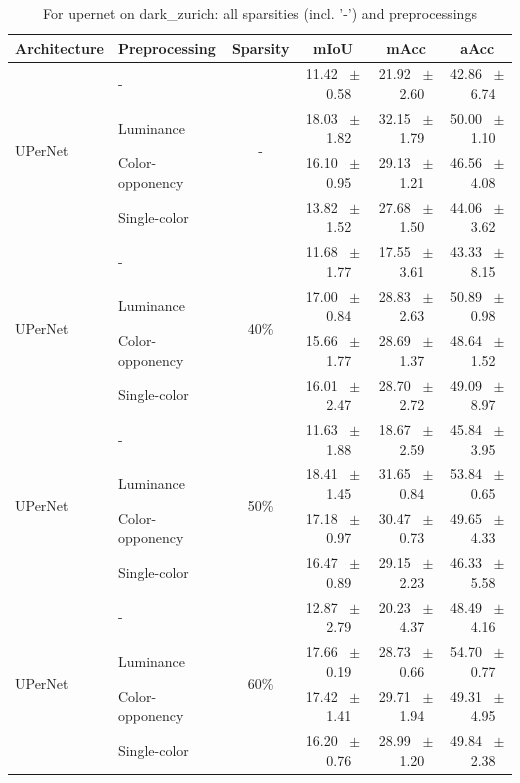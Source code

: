 \begin{table}[h]
  \centering
  \caption{For upernet on dark_zurich: all sparsities (incl. '-') and preprocessings}
  \begin{tabular}{@{}l l c c c c@{}}
    \toprule
    Architecture & Preprocessing & Sparsity & mIoU & mAcc & aAcc \\
    \midrule
    \multirow{4}{*}{UPerNet} & - & \multirow{4}{*}{-} & 11.42 ~$\pm$~ 0.58 & 21.92 ~$\pm$~ 2.60 & 42.86 ~$\pm$~ 6.74 \\
    & Luminance &  & 18.03 ~$\pm$~ 1.82 & 32.15 ~$\pm$~ 1.79 & 50.00 ~$\pm$~ 1.10 \\
    & Color-opponency &  & 16.10 ~$\pm$~ 0.95 & 29.13 ~$\pm$~ 1.21 & 46.56 ~$\pm$~ 4.08 \\
    & Single-color &  & 13.82 ~$\pm$~ 1.52 & 27.68 ~$\pm$~ 1.50 & 44.06 ~$\pm$~ 3.62 \\
    \midrule
    \multirow{4}{*}{UPerNet} & - & \multirow{4}{*}{40\%} & 11.68 ~$\pm$~ 1.77 & 17.55 ~$\pm$~ 3.61 & 43.33 ~$\pm$~ 8.15 \\
    & Luminance &  & 17.00 ~$\pm$~ 0.84 & 28.83 ~$\pm$~ 2.63 & 50.89 ~$\pm$~ 0.98 \\
    & Color-opponency &  & 15.66 ~$\pm$~ 1.77 & 28.69 ~$\pm$~ 1.37 & 48.64 ~$\pm$~ 1.52 \\
    & Single-color &  & 16.01 ~$\pm$~ 2.47 & 28.70 ~$\pm$~ 2.72 & 49.09 ~$\pm$~ 8.97 \\
    \midrule
    \multirow{4}{*}{UPerNet} & - & \multirow{4}{*}{50\%} & 11.63 ~$\pm$~ 1.88 & 18.67 ~$\pm$~ 2.59 & 45.84 ~$\pm$~ 3.95 \\
    & Luminance &  & 18.41 ~$\pm$~ 1.45 & 31.65 ~$\pm$~ 0.84 & 53.84 ~$\pm$~ 0.65 \\
    & Color-opponency &  & 17.18 ~$\pm$~ 0.97 & 30.47 ~$\pm$~ 0.73 & 49.65 ~$\pm$~ 4.33 \\
    & Single-color &  & 16.47 ~$\pm$~ 0.89 & 29.15 ~$\pm$~ 2.23 & 46.33 ~$\pm$~ 5.58 \\
    \midrule
    \multirow{4}{*}{UPerNet} & - & \multirow{4}{*}{60\%} & 12.87 ~$\pm$~ 2.79 & 20.23 ~$\pm$~ 4.37 & 48.49 ~$\pm$~ 4.16 \\
    & Luminance &  & 17.66 ~$\pm$~ 0.19 & 28.73 ~$\pm$~ 0.66 & 54.70 ~$\pm$~ 0.77 \\
    & Color-opponency &  & 17.42 ~$\pm$~ 1.41 & 29.71 ~$\pm$~ 1.94 & 49.31 ~$\pm$~ 4.95 \\
    & Single-color &  & 16.20 ~$\pm$~ 0.76 & 28.99 ~$\pm$~ 1.20 & 49.84 ~$\pm$~ 2.38 \\
    \midrule

\end{tabular}
\end{table}
